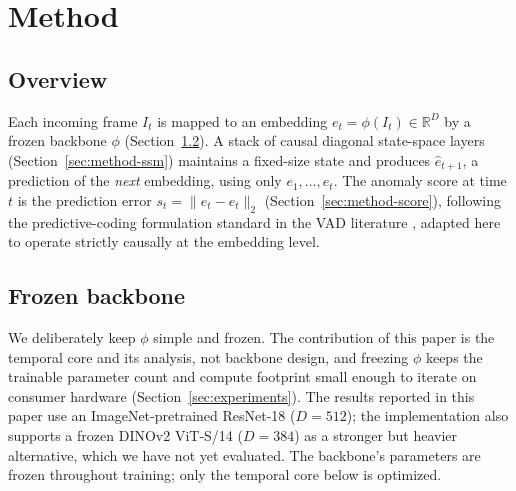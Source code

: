 \section{Method}
\label{sec:method}

\subsection{Overview}
Each incoming frame $I_t$ is mapped to an embedding $e_t = \phi(I_t) \in
\mathbb{R}^D$ by a frozen backbone $\phi$ (Section~\ref{sec:method-backbone}).
A stack of causal diagonal state-space layers (Section~\ref{sec:method-ssm})
maintains a fixed-size state and produces $\hat{e}_{t+1}$, a prediction of
the \emph{next} embedding, using only $e_1,\dots,e_t$. The anomaly score at
time $t$ is the prediction error
$s_t = \lVert \hat{e}_t - e_t \rVert_2$ (Section~\ref{sec:method-score}),
following the predictive-coding formulation standard in the VAD literature
\cite{liu2018future}, adapted here to operate strictly causally at the
embedding level.

\subsection{Frozen backbone}
\label{sec:method-backbone}
We deliberately keep $\phi$ simple and frozen. The contribution of this paper is the temporal core and its analysis, not backbone design, and freezing $\phi$ keeps the trainable parameter count and compute footprint small enough to iterate on consumer hardware (Section~\ref{sec:experiments}). The results reported in this paper use an ImageNet-pretrained ResNet-18 ($D{=}512$); the implementation also supports a frozen DINOv2 ViT-S/14 ($D{=}384$) as a stronger but heavier alternative, which we have not yet evaluated. The backbone's parameters are frozen throughout training; only the temporal core below is optimized.

